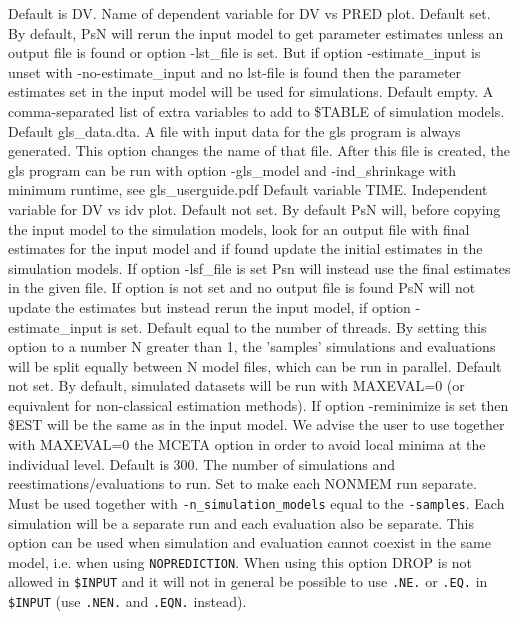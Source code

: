 \begin{optionlist}
Default is DV. Name of dependent variable for DV vs PRED plot.
\nextopt
{}
Default set. By default, PsN will rerun the input model to get parameter estimates unless an output file is found or option -lst\_file is set. But if option -estimate\_input is unset with -no-estimate\_input and no lst-file is found then the parameter estimates set in the input model will be used for simulations. 
\nextopt
{}
Default empty. A comma-separated list of extra variables to add to \$TABLE of simulation models.
\nextopt
{}
Default gls\_data.dta. A file with input data for the gls program is always generated. This option changes the name of that file. After this file is created, the gls program can be run with option \mbox{-gls\_model} and -ind\_shrinkage with minimum runtime, see gls\_userguide.pdf 
\nextopt
{}
Default variable TIME. Independent variable for DV vs idv plot.
\nextopt
{}
Default not set. By default PsN will, before copying the input model to the simulation models, look for an output file with final estimates for the input model and if found update the initial estimates in the simulation models. If option -lsf\_file is set Psn will instead use the final estimates in the given file. If option is not set and no output file is found PsN will not update the estimates but instead rerun the input model, if option -estimate\_input is set. 
\nextopt
{}
Default equal to the number of threads. By setting this option to a number N greater than 1, the 'samples' simulations and evaluations will be split equally between N model files, which can be run in parallel.
\nextopt
{}
Default not set. By default, simulated datasets will be run with MAXEVAL=0 (or equivalent for non-classical estimation methods). If option -reminimize is set then \$EST will be the same as in the input model. We advise the user to use together with MAXEVAL=0 the MCETA option in order to avoid local minima at the individual level.
\nextopt
{}
Default is 300. The number of simulations and reestimations/evaluations to run. 
\nextopt
{}
    Set to make each NONMEM run separate. Must be used together with \verb|-n_simulation_models| equal to the \verb|-samples|. Each simulation will be a separate run and each evaluation also be separate. This option can be used when simulation and evaluation cannot coexist in the same model, i.e. when using \verb|NOPREDICTION|. When using this option DROP is not allowed in \verb|$INPUT| and it will not in general be possible to use \verb|.NE.| or \verb|.EQ.| in \verb|$INPUT| (use \verb|.NEN.| and \verb|.EQN.| instead).
\nextopt
\end{optionlist}

